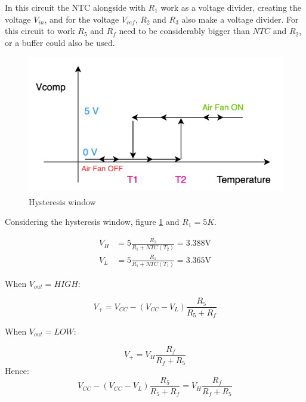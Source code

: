 In this circuit the NTC alongside with $R_1$ work as a voltage divider, creating the voltage $V_{in}$, and for the voltage $V_{ref}$, $R_2$ and $R_3$ also make a voltage divider. 
For this circuit to work $R_5$ and $R_f$ need to be considerably bigger than $NTC$ and $R_2$, or a buffer could also be used.

\begin{figure}[H]
    \centering
    \includegraphics*[scale = 0.5]{Images/HysteresisWindow.png}
    \caption{Hysteresis window \textsuperscript{\cite{Individual_statement}}}
    \label{fig:HysterWindow}
\end{figure}

Considering the hysteresis window, figure \ref{fig:HysterWindow} and $R_1 = 5K$.

\begin{equation}
    \begin{aligned}
        V_H &= 5\frac{R_1}{R_1 + NTC(T_2)} = 3.388 \si{\V}\\
        V_L &= 5\frac{R_1}{R_1 + NTC(T_1)} = 3.365 \si{\V}
    \end{aligned}
\end{equation}


When $V_{out} = HIGH$:

\begin{equation}
    V_+ = V_{CC}-\left (V_{CC}-V_L\right )\frac{R_5}{R_5 + R_f}
\end{equation}

When $V_{out} = LOW$:

\begin{equation}
    V_+ = V_H\frac{R_f}{R_f + R_5}
    \label{eq:VpLow}
\end{equation}
Hence:
\begin{equation}
    V_{CC}-\left (V_{CC}-V_L\right )\frac{R_5}{R_5 + R_f} = V_H\frac{R_f}{R_f + R_5}
    \label{eq:solR5}
\end{equation}

